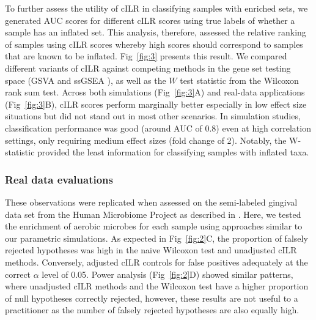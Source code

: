 \documentclass[10pt,letterpaper]{article}
\begin{document}
To further assess the utility of cILR in classifying samples with enriched sets, we generated AUC scores for different cILR scores using true labels of whether a sample has an inflated set. This analysis, therefore, assessed the relative ranking of samples using cILR scores whereby high scores should correspond to samples that are known to be inflated. Fig~\ref{fig:3} presents this result. We compared different variants of cILR against competing methods in the gene set testing space (GSVA \cite{hanzelmann2013} and ssGSEA \cite{barbie2009}), as well as the $W$ test statistic from the Wilcoxon rank sum test. Across both simulations (Fig~\ref{fig:3}A) and real-data applications (Fig~\ref{fig:3}B), cILR scores perform marginally better especially in low effect size situations but did not stand out in most other scenarios. In simulation studies, classification performance was good (around AUC of 0.8) even at high correlation settings, only requiring medium effect sizes (fold change of 2). Notably, the W-statistic provided the least information for classifying samples with inflated taxa.

\subsubsection*{Real data evaluations}  
These observations were replicated when assessed on the semi-labeled gingival data set from the Human Microbiome Project as described in . Here, we tested the enrichment of aerobic microbes for each sample using approaches similar to our parametric simulations. As expected in Fig~\ref{fig:2}C, the proportion of falsely rejected hypotheses was high in the naive Wilcoxon test and unadjusted cILR methods. Conversely, adjusted cILR controls for false positives adequately at the correct $\alpha$ level of 0.05. Power analysis (Fig~\ref{fig:2}D) showed similar patterns, where unadjusted cILR methods and the Wilcoxon test have a higher proportion of null hypotheses correctly rejected, however, these results are not useful to a practitioner as the number of falsely rejected hypotheses are also equally high.  
\end{document}
